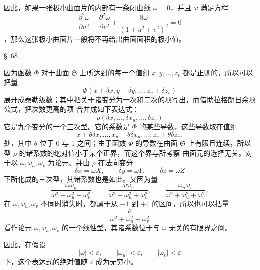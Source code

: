\documentclass[11pt,a4paper,leqno]{article}
\begin{document}
因此，如果一张极小曲面片的内部有一条闭曲线 $\omega=0$，并且 $\omega$ 满足方程
\[
\frac{\partial^2\omega}{\partial u^2}
+\frac{\partial^2\omega}{\partial v^2}
+\frac{8\omega}{(1+u^2+v^2)^2}=0
\]
，那么这张极小曲面片一般将不再给出曲面面积的极小值。

\begin{center}
{\large \S~68.}
\end{center}

因为函数 $\Phi$ 对于曲面 $\mathfrak{S}$ 上所达到的每一个值组
$x,y,\ldots,z_v$ 都是正则的，所以可以把量
\[
\Phi(x+\delta x,y+\delta y,\ldots,z_v+\delta z_v)
\]
展开成泰勒级数；其中把关于诸变分为一次和二次的项写出，而借助拉格朗日余项公式，把次数更高的项
合并成如下表达式：
\[
\rho(\delta x,\ldots,\delta x_u,\ldots,\delta z_v)
\]
它是九个变分的一个三次型。它的系数是 $\Phi$ 的某些导数，这些导数取在值组
\[
x+\theta\delta x,\ldots,x_u+\theta\delta x_u,\ldots,
z_v+\theta\delta z_v,
\]
处，其中 $\theta$ 位于 0 与 1 之间；由于函数 $\Phi$ 的导数在曲面
$\mathfrak{S}$ 上有限且连续，所以型 $\rho$ 的诸系数的绝对值小于某个正界，而这个界与所考察
曲面元的选择无关。对于以 $\omega,\omega_u,\omega_v$ 为论元、并由 $\rho$ 在法向变分
\begin{equation}\tag{31}
\delta x=\omega X,\qquad \delta y=\omega Y,\qquad \delta z=\omega Z
\end{equation}
下所化成的三次型，其诸系数也是如此。又因为量
\[
\frac{\omega\omega_u}{\omega^2+\omega_u^2+\omega_v^2},\qquad
\frac{\omega\omega_v}{\omega^2+\omega_u^2+\omega_v^2},\qquad
\frac{\omega_u\omega_v}{\omega^2+\omega_u^2+\omega_v^2},
\]
在 $\omega,\omega_u,\omega_v$ 不同时消失时，都属于从 $-1$ 到 $+1$ 的区间，所以也可以把量
\[
\frac{\rho}{\omega^2+\omega_u^2+\omega_v^2}
\]
看作论元 $\omega,\omega_u,\omega_v$ 的一个线性型，其诸系数位于与 $\omega$ 无关的有限界之间。

因此，在假设
\begin{equation}\tag{32}
|\omega|<\varepsilon,\qquad |\omega_u|<\varepsilon,\qquad
|\omega_v|<\varepsilon
\end{equation}
下，这个表达式的绝对值随 $\varepsilon$ 成为无穷小。
\end{document}
